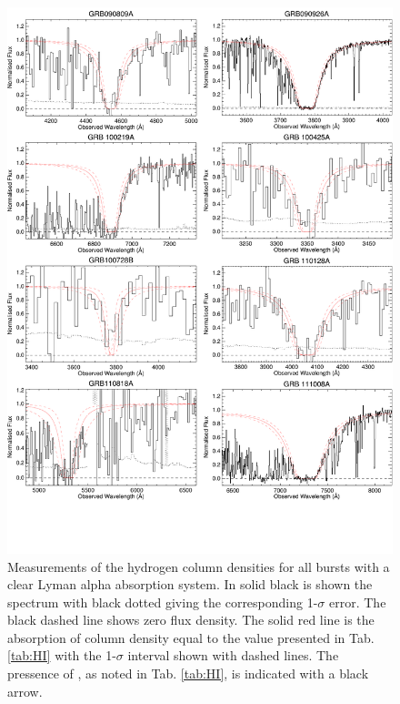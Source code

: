 \documentclass[longauth]{aa}    %
\begin{document}




\clearpage

\begin{figure}[!h]
	\centering
	\includegraphics[page=1, width=0.85\linewidth]{figures/HI_measurements.pdf}
	\caption{Measurements of the hydrogen column densities for all bursts with a
		clear Lyman alpha absorption system. In solid black is shown the spectrum with
		black dotted giving the corresponding 1-$\sigma$ error. The black dashed line shows zero
		flux density. The solid red line is the absorption of column density equal to
		the value presented in Tab. \ref{tab:HI} with the 1-$\sigma$ interval shown
		with dashed lines. The pressence of \lya, as noted in Tab. \ref{tab:HI}, is indicated with a black arrow.}
	\label{fig:HI1}
\end{figure}
\clearpage
\end{document}
